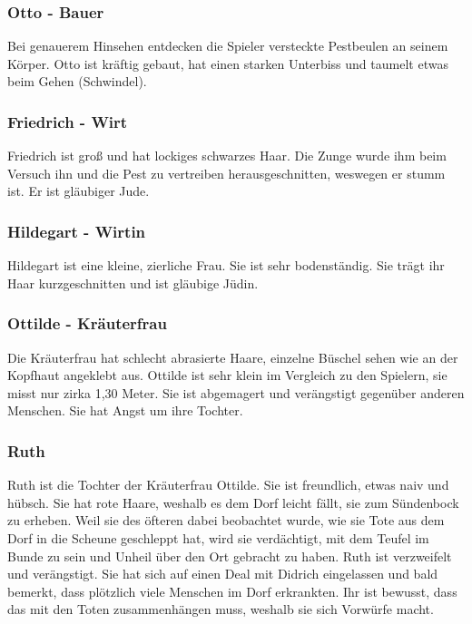 \subsubsection*{Otto - Bauer}
\label{Otto}

Bei genauerem Hinsehen entdecken die Spieler versteckte Pestbeulen an seinem Körper. Otto ist kräftig gebaut, hat einen starken Unterbiss und taumelt etwas beim Gehen (Schwindel).

\subsubsection*{Friedrich - Wirt}
\label{Friedrich}

Friedrich ist groß und hat lockiges schwarzes Haar. Die Zunge wurde ihm beim Versuch ihn und die Pest zu vertreiben herausgeschnitten, weswegen er stumm ist. Er ist gläubiger Jude.

\subsubsection*{Hildegart - Wirtin}
\label{Hildegart}

Hildegart ist eine kleine, zierliche Frau. Sie ist sehr bodenständig. Sie trägt ihr Haar kurzgeschnitten und ist gläubige Jüdin.

\subsubsection*{Ottilde - Kräuterfrau}
\label{Ottilde}

Die Kräuterfrau hat schlecht abrasierte Haare, einzelne Büschel sehen wie an der Kopfhaut angeklebt aus. Ottilde ist sehr klein im Vergleich zu den Spielern, sie misst nur zirka 1,30 Meter. Sie ist abgemagert und verängstigt gegenüber anderen Menschen. Sie hat Angst um ihre Tochter.

\subsubsection*{Ruth}
\label{Ruth}

Ruth ist die Tochter der Kräuterfrau Ottilde. Sie ist freundlich, etwas naiv und hübsch. Sie hat rote Haare, weshalb es dem Dorf leicht fällt, sie zum Sündenbock zu erheben. Weil sie des öfteren dabei beobachtet wurde, wie sie Tote aus dem Dorf in die Scheune geschleppt hat, wird sie verdächtigt, mit dem Teufel im Bunde zu sein und Unheil über den Ort gebracht zu haben. Ruth ist verzweifelt und verängstigt. Sie hat sich auf einen Deal mit Didrich eingelassen und bald bemerkt, dass plötzlich viele Menschen im Dorf erkrankten. Ihr ist bewusst, dass das mit den Toten zusammenhängen muss, weshalb sie sich Vorwürfe macht.


